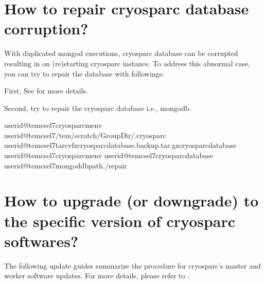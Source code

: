 \documentclass[a4paper,11pt,english]{sphinxmanual}
\begin{document}
\section{How to repair cryosparc database corruption?}
\label{\detokenize{faq:how-to-repair-cryosparc-database-corruption}}\label{\detokenize{faq:how-to-repair-cryosparc-database-corruption-caused-by-duplicated-mongod-executions}}
\sphinxAtStartPar
With duplicated mongod executions, cryosparc database can be corrupted resulting in  on (re)starting cryosparc instance. To address this abnormal case, you can try to repair the database with followings:

\sphinxAtStartPar
First,  See {\hyperref[\detokenize{faq:how-to-resolve-the-problems-on-re-starting-your-own-cryosparc-instance}]{}}  for more details.

\sphinxAtStartPar
Second, try to repair the cryosparc database i.e., mongodb.

\begin{sphinxVerbatim}[commandchars=\\\{\}]
userid@tem\PYGZhy{}cs\PYGZhy{}el7\PYGZdl{}\PYGZgt{}cryosparcmenv
userid@tem\PYGZhy{}cs\PYGZhy{}el7\PYGZdl{}\PYGZgt{}/tem/scratch/\PYGZlt{}GroupDir\PYGZgt{}/.cryosparc
userid@tem\PYGZhy{}cs\PYGZhy{}el7\PYGZdl{}\PYGZgt{}tarcvfzcryosparc\PYGZus{}database.backup.tar.gzcryosparc\PYGZus{}database
userid@tem\PYGZhy{}cs\PYGZhy{}el7\PYGZdl{}\PYGZgt{}cryosparcmenv
userid@tem\PYGZhy{}cs\PYGZhy{}el7\PYGZdl{}\PYGZgt{}cryosparc\PYGZus{}database
userid@tem\PYGZhy{}cs\PYGZhy{}el7\PYGZdl{}\PYGZgt{}mongod\PYGZhy{}\PYGZhy{}dbpath./\PYGZhy{}\PYGZhy{}repair
\end{sphinxVerbatim}


\section{How to upgrade (or downgrade) to the specific version of cryosparc softwares?}
\label{\detokenize{faq:how-to-upgrade-or-downgrade-to-the-specific-version-of-cryosparc-softwares}}\label{\detokenize{faq:how-to-update-cryosparc-softwares}}
\sphinxAtStartPar
The following update guides summarize the procedure for cryosparc’s master and worker software updates.
For more details, please refer to .
\end{document}
